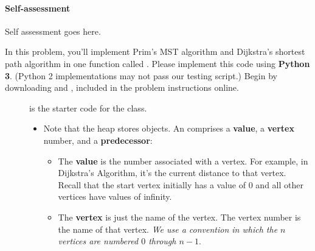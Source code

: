 \documentclass{ks-pset}
\begin{document}
\begin{solution}

  \begin{subproblems}
    
    \item

    \item 

  \end{subproblems}

  \paragraph{Self-assessment} Self assessment goes here.
\end{solution}


\begin{problem}[\Py{PrimDijkstra}, 65]

  In this problem, you'll implement Prim's MST algorithm and Dijkstra's
  shortest path algorithm in one function called . Please
  implement this code using \textbf{Python 3}. (Python 2 implementations may
  not pass our testing script.) Begin by downloading  and
  , included in the problem instructions online.

  \begin{description}

    \item[]  is the starter code for the
       class.

      \begin{itemize}

        \item Note that the heap stores  objects. An 
          comprises a \textbf{value}, a \textbf{vertex} number, and a
          \textbf{predecessor}:

          \begin{itemize}

            \item The \textbf{value} is the number associated with a vertex.
              For example, in Dijkstra's Algorithm, it's the current distance
              to that vertex. Recall that the start vertex initially has a
              value of \(0\) and all other vertices have values of infinity.

            \item The \textbf{vertex} is just the name of the vertex. The
              vertex number is the name of that vertex.  \emph{We use a
                convention in which the \(n\) vertices are numbered \(0\)
              through \(n-1\)}.


\end{itemize}
\end{itemize}
\end{description}
\end{problem}
\end{document}
